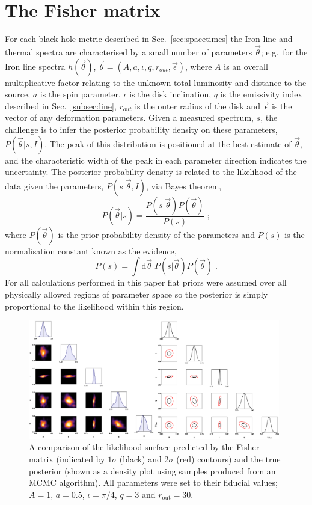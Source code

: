 \section{The Fisher matrix}\label{sec:analysis}
For each black hole metric described in Sec.\ \ref{sec:spacetimes} the Iron line and thermal spectra are characterised by a small number of parameters $\vec{\theta}$; e.g.\ for the Iron line spectra $h(\vec{\theta})$, $\vec{\theta}=(A,a,\iota,q,r_{out},\vec{\epsilon})$, where $A$ is an overall multiplicative factor relating to the unknown total luminosity and distance to the source, $a$ is the spin parameter, $\iota$ is the disk inclination, $q$ is the emissivity index described in Sec.\ \ref{subsec:line}, $r_{out}$ is the outer radius of the disk and $\vec{\epsilon}$ is the vector of any deformation parameters. Given a measured spectrum, $s$, the challenge is to infer the posterior probability density on these parameters, $P(\vec{\theta}|s,I)$. The peak of this distribution is positioned at the best estimate of $\vec{\theta}$, and the characteristic width of the peak in each parameter direction indicates the uncertainty. The posterior probability density is related to the likelihood of the data given the parameters, $P(s|\vec{\theta},I)$, via Bayes theorem,
\begin{equation}\label{eq:Bayes} P(\vec{\theta}|s)= \frac{P(s|\vec{\theta})P(\vec{\theta})}{P(s)}\; ;\end{equation}
where $P(\vec{\theta})$ is the prior probability density of the parameters and $P(s)$ is the normalisation constant known as the evidence,
\begin{equation} P(s)=\int\textrm{d}\vec{\theta}\;P(s|\vec{\theta})P(\vec{\theta}) \;.\end{equation}
For all calculations performed in this paper flat priors were assumed over all physically allowed regions of parameter space so the posterior is simply proportional to the likelihood within this region. 

\begin{figure}[t]
 \centering
 \includegraphics[trim=0cm 0cm 0cm 0cm, width=0.98\textwidth]{FishMCMC.png}
 \caption{A comparison of the likelihood surface predicted by the Fisher matrix (indicated by $1\sigma$ (black) and $2\sigma$ (red) contours) and the true posterior (shown as a density plot using samples produced from an MCMC algorithm). All parameters were set to their fiducial values; $A=1$, $a=0.5$, $\iota=\pi/4$, $q=3$ and $r_{\textrm{out}}=30$.}
 \label{fig:FishMCMC}
\end{figure}

